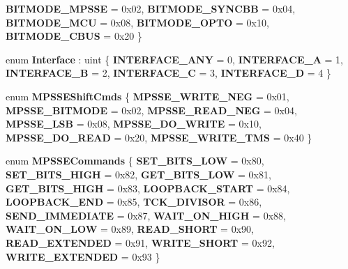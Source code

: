 \begin{DoxyCompactItemize}
{\bfseries B\+I\+T\+M\+O\+D\+E\+\_\+\+M\+P\+S\+SE} = 0x02, 
{\bfseries B\+I\+T\+M\+O\+D\+E\+\_\+\+S\+Y\+N\+C\+BB} = 0x04, 
\newline
{\bfseries B\+I\+T\+M\+O\+D\+E\+\_\+\+M\+CU} = 0x08, 
{\bfseries B\+I\+T\+M\+O\+D\+E\+\_\+\+O\+P\+TO} = 0x10, 
{\bfseries B\+I\+T\+M\+O\+D\+E\+\_\+\+C\+B\+US} = 0x20
 \}
\item 
\mbox{\label{namespacelibftdinet_a98fd34eea062179a149e562cb9bad731}} 
enum {\bfseries Interface} \+: uint \{ \newline
{\bfseries I\+N\+T\+E\+R\+F\+A\+C\+E\+\_\+\+A\+NY} = 0, 
{\bfseries I\+N\+T\+E\+R\+F\+A\+C\+E\+\_\+A} = 1, 
{\bfseries I\+N\+T\+E\+R\+F\+A\+C\+E\+\_\+B} = 2, 
{\bfseries I\+N\+T\+E\+R\+F\+A\+C\+E\+\_\+C} = 3, 
\newline
{\bfseries I\+N\+T\+E\+R\+F\+A\+C\+E\+\_\+D} = 4
 \}
\item 
\mbox{\label{namespacelibftdinet_a6c78c144891e9363a7be64130636a084}} 
enum {\bfseries M\+P\+S\+S\+E\+Shift\+Cmds} \{ \newline
{\bfseries M\+P\+S\+S\+E\+\_\+\+W\+R\+I\+T\+E\+\_\+\+N\+EG} = 0x01, 
{\bfseries M\+P\+S\+S\+E\+\_\+\+B\+I\+T\+M\+O\+DE} = 0x02, 
{\bfseries M\+P\+S\+S\+E\+\_\+\+R\+E\+A\+D\+\_\+\+N\+EG} = 0x04, 
{\bfseries M\+P\+S\+S\+E\+\_\+\+L\+SB} = 0x08, 
\newline
{\bfseries M\+P\+S\+S\+E\+\_\+\+D\+O\+\_\+\+W\+R\+I\+TE} = 0x10, 
{\bfseries M\+P\+S\+S\+E\+\_\+\+D\+O\+\_\+\+R\+E\+AD} = 0x20, 
{\bfseries M\+P\+S\+S\+E\+\_\+\+W\+R\+I\+T\+E\+\_\+\+T\+MS} = 0x40
 \}
\item 
\mbox{\label{namespacelibftdinet_ab8e769c649f070ee3f4fd0cfe1518551}} 
enum {\bfseries M\+P\+S\+S\+E\+Commands} \{ \newline
{\bfseries S\+E\+T\+\_\+\+B\+I\+T\+S\+\_\+\+L\+OW} = 0x80, 
{\bfseries S\+E\+T\+\_\+\+B\+I\+T\+S\+\_\+\+H\+I\+GH} = 0x82, 
{\bfseries G\+E\+T\+\_\+\+B\+I\+T\+S\+\_\+\+L\+OW} = 0x81, 
{\bfseries G\+E\+T\+\_\+\+B\+I\+T\+S\+\_\+\+H\+I\+GH} = 0x83, 
\newline
{\bfseries L\+O\+O\+P\+B\+A\+C\+K\+\_\+\+S\+T\+A\+RT} = 0x84, 
{\bfseries L\+O\+O\+P\+B\+A\+C\+K\+\_\+\+E\+ND} = 0x85, 
{\bfseries T\+C\+K\+\_\+\+D\+I\+V\+I\+S\+OR} = 0x86, 
{\bfseries S\+E\+N\+D\+\_\+\+I\+M\+M\+E\+D\+I\+A\+TE} = 0x87, 
\newline
{\bfseries W\+A\+I\+T\+\_\+\+O\+N\+\_\+\+H\+I\+GH} = 0x88, 
{\bfseries W\+A\+I\+T\+\_\+\+O\+N\+\_\+\+L\+OW} = 0x89, 
{\bfseries R\+E\+A\+D\+\_\+\+S\+H\+O\+RT} = 0x90, 
{\bfseries R\+E\+A\+D\+\_\+\+E\+X\+T\+E\+N\+D\+ED} = 0x91, 
\newline
{\bfseries W\+R\+I\+T\+E\+\_\+\+S\+H\+O\+RT} = 0x92, 
{\bfseries W\+R\+I\+T\+E\+\_\+\+E\+X\+T\+E\+N\+D\+ED} = 0x93
 \}
\end{DoxyCompactItemize}
